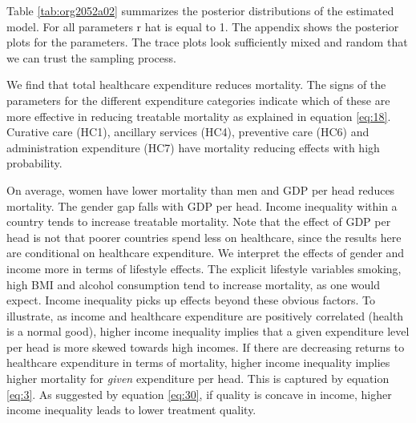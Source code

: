 \documentclass{article}
\begin{document}
Table \ref{tab:org2052a02} summarizes the posterior distributions of the estimated model. For all parameters r hat is equal to 1. The appendix shows the posterior plots for the parameters. The trace plots look sufficiently mixed and random that we can trust the sampling process.

We find that total healthcare expenditure reduces mortality. The signs of the parameters for the different expenditure categories indicate which of these are more effective in reducing treatable mortality as explained in equation \eqref{eq:18}. Curative care (HC1), ancillary services (HC4), preventive care (HC6) and administration expenditure (HC7) have mortality reducing effects with high probability.

On average, women have lower mortality than men and GDP per head reduces mortality. The gender gap falls with GDP per head. Income inequality within a country tends to increase treatable mortality. Note that the effect of GDP per head is not that poorer countries spend less on healthcare, since the results here are conditional on healthcare expenditure. We interpret the effects of gender and income more in terms of lifestyle effects. The explicit lifestyle variables smoking, high BMI and alcohol consumption tend to increase mortality, as one would expect. Income inequality picks up effects beyond these obvious factors. To illustrate, as income and healthcare expenditure are positively correlated (health is a normal good), higher income inequality implies that a given expenditure level per head is more skewed towards high incomes. If there are decreasing returns to healthcare expenditure in terms of mortality, higher income inequality implies higher mortality for \emph{given} expenditure per head. This is captured by equation \eqref{eq:3}. As suggested by equation \eqref{eq:30}, if quality is concave in income, higher income inequality leads to lower treatment quality.
\end{document}
